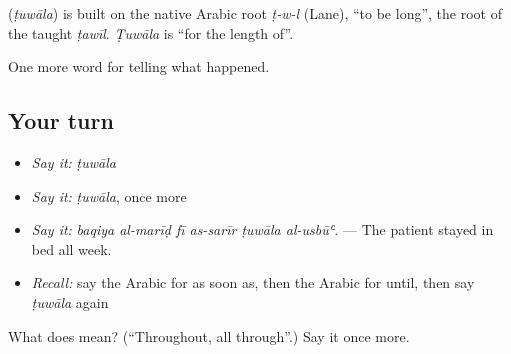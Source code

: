 \begin{cousinweb}
\textbf{} (\emph{ṭuwāla}) is built on the native Arabic root \emph{ṭ-w-l} (Lane), \textquotedblleft{}to be long\textquotedblright{}, the root of the taught \emph{ṭawīl}. \emph{Ṭuwāla} is \textquotedblleft{}for the length of\textquotedblright{}.
\end{cousinweb}

\begin{grammarlens}[title={What you've built}]
One more word for telling what happened.
\end{grammarlens}

\subsection*{Your turn}
\begin{itemize}
\raggedright
  \item \emph{Say it:} \emph{ṭuwāla}
  \item \emph{Say it:} \emph{ṭuwāla}, once more
  \item \emph{Say it:} \emph{baqiya al-marīḍ fī as-sarīr ṭuwāla al-usbūʿ.} — The patient stayed in bed all week.
  \item \emph{Recall:} say the Arabic for as soon as, then the Arabic for until, then say \emph{ṭuwāla} again
\end{itemize}

\begin{tcolorbox}[breakable,colback=teal!4,colframe=teal!35!black,title={Before you move on}]
What does  mean? (\textquotedblleft{}Throughout, all through\textquotedblright{}.) Say it once more.
\end{tcolorbox}
